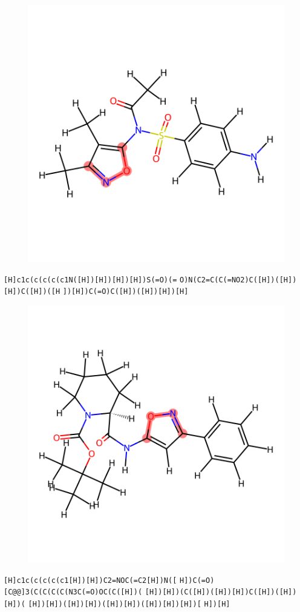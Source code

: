 \documentclass{article}
\begin{document}
\begin{figure}[ht]
\centering
    \includegraphics{mol284.png}
\end{figure}
\verb|[H]c1c(c(c(c(c1N([H])[H])[H])[H])S(=O)(=| \verb|O)N(C2=C(C(=NO2)C([H])([H])[H])C([H])([H| \verb|])[H])C(=O)C([H])([H])[H])[H]|

\begin{figure}[ht]
\centering
    \includegraphics{mol285.png}
\end{figure}
\verb|[H]c1c(c(c(c(c1[H])[H])C2=NOC(=C2[H])N([| \verb|H])C(=O)[C@@]3(C(C(C(C(N3C(=O)OC(C([H])(| \verb|[H])[H])(C([H])([H])[H])C([H])([H])[H])(| \verb|[H])[H])([H])[H])([H])[H])([H])[H])[H])[| \verb|H])[H]|
\end{document}
